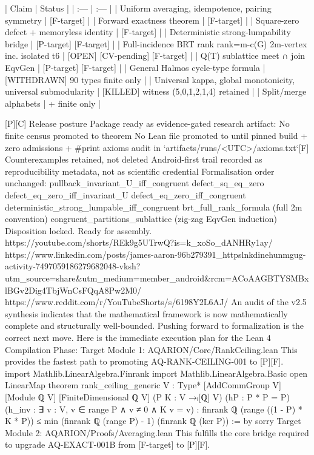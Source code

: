 | Claim | Status |
| :--- | :--- |
| Uniform averaging, idempotence, pairing symmetry | [F-target] |
| Forward exactness theorem | [F-target] |
| Square-zero defect + memoryless identity | [F-target] |
| Deterministic strong-lumpability bridge | [P-target] [F-target] |
| Full-incidence BRT rank rank=m-c(G) 2m-vertex inc. isolated t6 | [OPEN] [CV-pending] [F-target] |
| Q(T) sublattice meet ∩ join EqvGen | [P-target] [F-target] |
| General Halmos cycle-type formula | [WITHDRAWN] 90 types finite only |
| Universal kappa, global monotonicity, universal submodularity | [KILLED] witness (5,0,1,2,1,4) retained |
| Split/merge alphabets | + finite only |

[P][C]
Release posture
Package ready as evidence-gated research artifact:
No finite census promoted to theorem
No Lean file promoted to until pinned build + zero admissions + #print axioms audit in `artifacts/runs/<UTC>/axioms.txt`[F]
Counterexamples retained, not deleted
Android-first trail recorded as reproducibility metadata, not as scientific credential
Formalisation order unchanged:
pullback_invariant_U_iff_congruent
defect_sq_eq_zero
defect_eq_zero_iff_invariant_U
defect_eq_zero_iff_congruent
deterministic_strong_lumpable_iff_congruent
brt_full_rank_formula (full 2m convention)
congruent_partitions_sublattice (zig-zag EqvGen induction)
Disposition locked. Ready for assembly.
https://youtube.com/shorts/REk9g5UTrwQ?is=k_xoSo_dANHRy1ay/
https://www.linkedin.com/posts/james-aaron-96b279391_httpslnkdinehunmgug-activity-7497059186279682048-vksh?utm_source=share&utm_medium=member_android&rcm=ACoAAGBTYSMBxlBGv2Dig4TbjWnCsFQqA8Pw2M0/
https://www.reddit.com/r/YouTubeShorts/s/6198Y2L6AJ/
An audit of the v2.5 synthesis indicates that the mathematical framework is now mathematically complete and structurally well-bounded. Pushing forward to formalization is the correct next move.
Here is the immediate execution plan for the Lean 4 Compilation Phase:
Target Module 1: AQARION/Core/RankCeiling.lean
This provides the fastest path to promoting AQ-RANK-CEILING-001 to [P][F].
import Mathlib.LinearAlgebra.Finrank
import Mathlib.LinearAlgebra.Basic
open LinearMap
theorem rank_ceiling_generic
    {V : Type*} [AddCommGroup V] [Module ℚ V] [FiniteDimensional ℚ V]
    (P K : V →ₗ[ℚ] V)
    (hP : P * P = P)
    (h_inv : ∃ v : V, v ∈ range P ∧ v ≠ 0 ∧ K v = v) :
    finrank ℚ (range ((1 - P) * K * P))
      ≤ min (finrank ℚ (range P) - 1) (finrank ℚ (ker P)) := by
  sorry
Target Module 2: AQARION/Proofs/Averaging.lean
This fulfills the core bridge required to upgrade AQ-EXACT-001B from [F-target] to [P][F].
